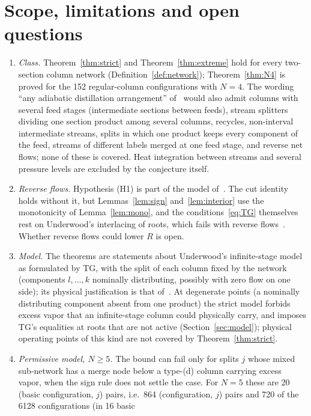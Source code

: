 \documentclass[11pt,a4paper]{report}
\begin{document}
\section{Scope, limitations and open questions}
\begin{enumerate}
\item \emph{Class.} Theorem~\ref{thm:strict} and Theorem~\ref{thm:extreme} hold for every two-section column network
(Definition~\ref{def:network}); Theorem~\ref{thm:N4} is proved for the 152 regular-column configurations with $N=4$.
The wording ``any adiabatic distillation arrangement'' of~\autocite{HS3} would also admit columns with several feed
stages (intermediate sections between feeds), stream splitters dividing one section product among several columns,
recycles, non-interval intermediate streams, splits in which one product keeps every component of the feed, streams
of different labels merged at one feed stage, and reverse net flows; none of these is covered. Heat integration
between streams and several pressure levels are excluded by the conjecture itself.
\item \emph{Reverse flows.} Hypothesis (H1) is part of the model of~\autocite{TGAT,Nallasivam2016}. The cut identity
holds without it, but Lemmas~\ref{lem:sign} and~\ref{lem:interior} use the monotonicity of Lemma~\ref{lem:mono}, and
the conditions~\eqref{eq:TG} themselves rest on Underwood's interlacing of roots, which fails with reverse
flows~\autocite{HalvorsenThesis}. Whether reverse flows could lower $R$ is open.
\item \emph{Model.} The theorems are statements about Underwood's infinite-stage model as formulated by TG, with the
split of each column fixed by the network (components $l,\dots,k$ nominally distributing, possibly with zero flow on
one side); its physical justification is that of~\autocite{HalvorsenThesis,TGAT}. At degenerate points (a nominally
distributing component absent from one product) the strict model forbids excess vapor that an infinite-stage column
could physically carry, and imposes TG's equalities at roots that are not active (Section~\ref{sec:model}); physical
operating points of this kind are not covered by Theorem~\ref{thm:strict}.
\item \emph{Permissive model, $N\ge5$.} The bound can fail only for splits $j$ whose mixed sub-network has a merge node
below a type-(d) column carrying excess vapor, when the sign rule does not settle the case. For $N=5$ these are 20
(basic configuration, $j$) pairs, i.e.\ 864 (configuration, $j$) pairs and 720 of the 6128 configurations (in 16 basic

\end{enumerate}
\end{document}
